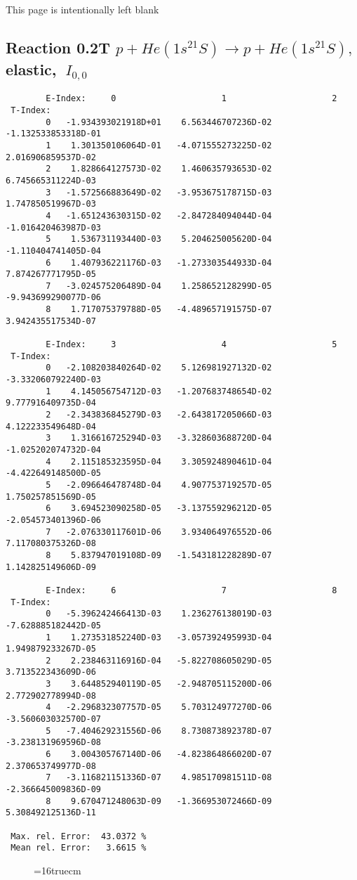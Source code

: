 \documentclass[12pt,dvipdfmx]{article}
\begin{document}
\newpage
This page is intentionally left blank
\newpage

\subsection{
Reaction 0.2T $ p + He(1s^21S) \rightarrow p + He(1s^21S) ,\  $
elastic, $ \  I_{0,0} $
}

\begin{small}\begin{verbatim}
        E-Index:     0                     1                     2
 T-Index:
        0   -1.934393021918D+01    6.563446707236D-02   -1.132533853318D-01
        1    1.301350106064D-01   -4.071555273225D-02    2.016906859537D-02
        2    1.828664127573D-02    1.460635793653D-02    6.745665311224D-03
        3   -1.572566883649D-02   -3.953675178715D-03    1.747850519967D-03
        4   -1.651243630315D-02   -2.847284094044D-04   -1.016420463987D-03
        5    1.536731193440D-03    5.204625005620D-04   -1.110404741405D-04
        6    1.407936221176D-03   -1.273303544933D-04    7.874267771795D-05
        7   -3.024575206489D-04    1.258652128299D-05   -9.943699290077D-06
        8    1.717075379788D-05   -4.489657191575D-07    3.942435517534D-07

        E-Index:     3                     4                     5
 T-Index:
        0   -2.108203840264D-02    5.126981927132D-02   -3.332060792240D-03
        1    4.145056754712D-03   -1.207683748654D-02    9.777916409735D-04
        2   -2.343836845279D-03   -2.643817205066D-03    4.122233549648D-04
        3    1.316616725294D-03   -3.328603688720D-04   -1.025202074732D-04
        4    2.115185323595D-04    3.305924890461D-04   -4.422649148500D-05
        5   -2.096646478748D-04    4.907753719257D-05    1.750257851569D-05
        6    3.694523090258D-05   -3.137559296212D-05   -2.054573401396D-06
        7   -2.076330117601D-06    3.934064976552D-06    7.117080375326D-08
        8    5.837947019108D-09   -1.543181228289D-07    1.142825149606D-09

        E-Index:     6                     7                     8
 T-Index:
        0   -5.396242466413D-03    1.236276138019D-03   -7.628885182442D-05
        1    1.273531852240D-03   -3.057392495993D-04    1.949879233267D-05
        2    2.238463116916D-04   -5.822708605029D-05    3.713522343609D-06
        3    3.644852940119D-05   -2.948705115200D-06    2.772902778994D-08
        4   -2.296832307757D-05    5.703124977270D-06   -3.560603032570D-07
        5   -7.404629231556D-06    8.730873892378D-07   -3.238131969596D-08
        6    3.004305767140D-06   -4.823864866020D-07    2.370653749977D-08
        7   -3.116821151336D-07    4.985170981511D-08   -2.366645009836D-09
        8    9.670471248063D-09   -1.366953072466D-09    5.308492125136D-11

 Max. rel. Error:  43.0372 %
 Mean rel. Error:   3.6615 %

\end{verbatim}\end{small}
\begin{figure} \label{0.2T}
\epsfxsize=16truecm
\end{figure}
\newpage
\end{document}
